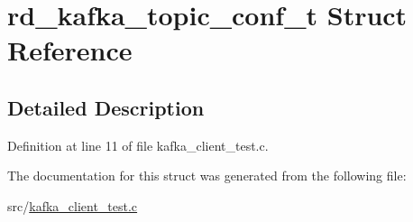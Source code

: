 \hypertarget{structrd__kafka__topic__conf__t}{\section{rd\-\_\-kafka\-\_\-topic\-\_\-conf\-\_\-t Struct Reference}
\label{structrd__kafka__topic__conf__t}
}


\subsection{Detailed Description}


Definition at line 11 of file kafka\-\_\-client\-\_\-test.\-c.



The documentation for this struct was generated from the following file\-:\begin{DoxyCompactItemize}
\item 
src/\hyperlink{kafka__client__test_8c}{kafka\-\_\-client\-\_\-test.\-c}\end{DoxyCompactItemize}
